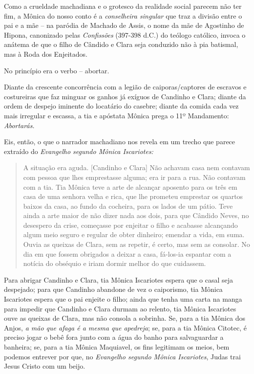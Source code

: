 Como a crueldade machadiana e o grotesco da realidade social parecem não
ter fim, a Mônica do nosso conto é a \emph{conselheira singular} que
traz a divisão entre o pai e a mãe -- na paródia de Machado de Assis, o
nome da mãe de Agostinho de Hipona, canonizado pelas \emph{Confissões}
(397-398 d.C.) do teólogo católico, invoca o anátema de que o filho de
Cândido e Clara seja conduzido não à pia batismal, mas à Roda dos
Enjeitados.

No princípio era o verbo -- abortar.

Diante da crescente concorrência com a legião de caiporas/captores de
escravos e costureiras que faz minguar os ganhos já exíguos de Candinho
e Clara; diante da ordem de despejo iminente do locatário do casebre;
diante da comida cada vez mais irregular e escassa, a tia e apóstata
Mônica prega o 11º Mandamento: \emph{Abortarás. }

Eis, então, o que o narrador machadiano nos revela em um trecho que
parece extraído do \emph{Evangelho segundo Mônica Iscariotes: }

\begin{quote}
A situação era aguda. {[}Candinho e Clara{]} Não achavam casa nem
contavam com pessoa que lhes emprestasse alguma; era ir para a rua. Não
contavam com a tia. Tia Mônica teve a arte de alcançar aposento para os
três em casa de uma senhora velha e rica, que lhe prometeu emprestar os
quartos baixos da casa, ao fundo da cocheira, para os lados de um pátio.
Teve ainda a arte maior de não dizer nada aos dois, para que Cândido
Neves, no desespero da crise, começasse por enjeitar o filho e acabasse
alcançando algum meio seguro e regular de obter dinheiro; emendar a
vida, em suma. Ouvia as queixas de Clara, sem as repetir, é certo, mas
sem as consolar. No dia em que fossem obrigados a deixar a casa,
fá-los-ia espantar com a notícia do obséquio e iriam dormir melhor do
que cuidassem.
\end{quote}

Para abrigar Candinho e Clara, tia Mônica Iscariotes espera que o casal
seja despejado; para que Candinho abandone de vez o caiporismo, tia
Mônica Iscariotes espera que o pai enjeite o filho; ainda que tenha uma
carta na manga para impedir que Candinho e Clara durmam ao relento, tia
Mônica Iscariotes ouve as queixas de Clara, mas não consola a sobrinha.
Se, para a tia Mônica dos Anjos, \emph{a mão que afaga é a mesma que
apedreja}; se, para a tia Mônica Citotec, é preciso jogar o bebê fora
junto com a água do banho para salvaguardar a banheira; se, para a tia
Mônica Maquiavel, os fins legitimam os meios, bem podemos entrever por
que, no \emph{Evangelho segundo Mônica Iscariotes}, Judas trai Jesus
Cristo com um beijo.

